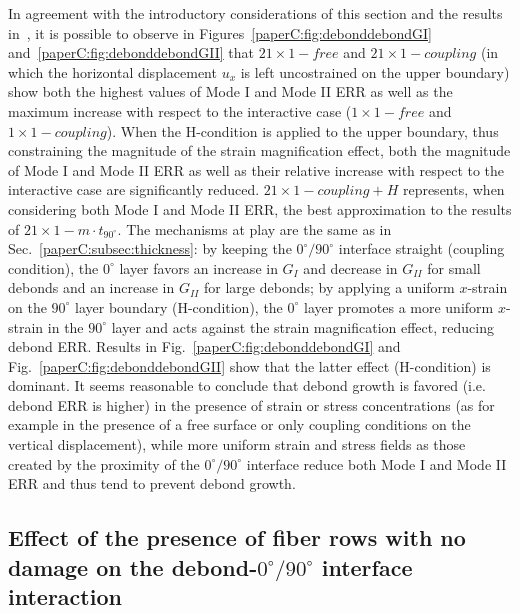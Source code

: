 In agreement with the introductory considerations of this section and the results in~\cite{DiStasio2019}, it is possible to observe in Figures~\ref{paperC:fig:debonddebondGI} and~\ref{paperC:fig:debonddebondGII} that $21\times 1-free$ and $21\times 1-coupling$ (in which the horizontal displacement $u_{x}$ is left uncostrained on the upper boundary) show both the highest values of Mode I and Mode II ERR as well as the maximum increase with respect to the interactive case ($1\times 1-free$ and $1\times 1-coupling$). When the H-condition is applied to the upper boundary, thus constraining the magnitude of the strain magnification effect, both the magnitude of Mode I and Mode II ERR as well as their relative increase with respect to the interactive case are significantly reduced. $21\times 1-coupling+H$ represents, when considering both Mode I and Mode II ERR, the best approximation to the results of $21\times 1-m\cdot t_{90^{\circ}}$. The mechanisms at play are the same as in Sec.~\ref{paperC:subsec:thickness}: by keeping the $0^{\circ}/90^{\circ}$ interface straight (coupling condition), the $0^{\circ}$ layer favors an increase in $G_{I}$ and decrease in $G_{II}$ for small debonds and an increase in $G_{II}$ for large debonds; by applying a uniform $x$-strain on the $90^{\circ}$ layer boundary (H-condition), the $0^{\circ}$ layer promotes a more uniform $x$-strain in the $90^{\circ}$ layer and acts against the strain magnification effect, reducing debond ERR. Results in Fig.~\ref{paperC:fig:debonddebondGI} and Fig.~\ref{paperC:fig:debonddebondGII} show that the latter effect (H-condition) is dominant. It seems reasonable to conclude that debond growth is favored (i.e. debond ERR is higher) in the presence of strain or stress concentrations (as for example in the presence of a free surface or only coupling conditions on the vertical displacement), while more uniform strain and stress fields as those created by the proximity of the $0^{\circ}/90^{\circ}$ interface reduce both Mode I and Mode II ERR and thus tend to prevent debond growth.

\subsection{Effect of the presence of fiber rows with no damage on the debond-$0^{\circ}/90^{\circ}$ interface interaction}

